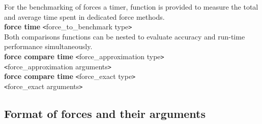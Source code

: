 \documentclass[11pt]{report}
\newcommand{\tempstart}{\texttt{<}}
\newcommand{\tempend}{\texttt{>}}
\begin{document}
For the benchmarking of forces a timer, function is provided to measure
the total and average time spent in dedicated force methods. \\

\noindent
{\bf force time} \tempstart force\_to\_benchmark type\tempend  \\

Both comparisons functions can
be nested to evaluate accuracy and run-time performance simultaneously.\\

\noindent
{\bf force compare time} \tempstart force\_approximation type\tempend  \\
\indent \tempstart force\_approximation arguments\tempend  \\
{\bf force compare time} \tempstart force\_exact type\tempend  \\
\indent \tempstart force\_exact arguments\tempend  \\



\newpage
\subsection{Format of forces and their arguments}
\end{document}
